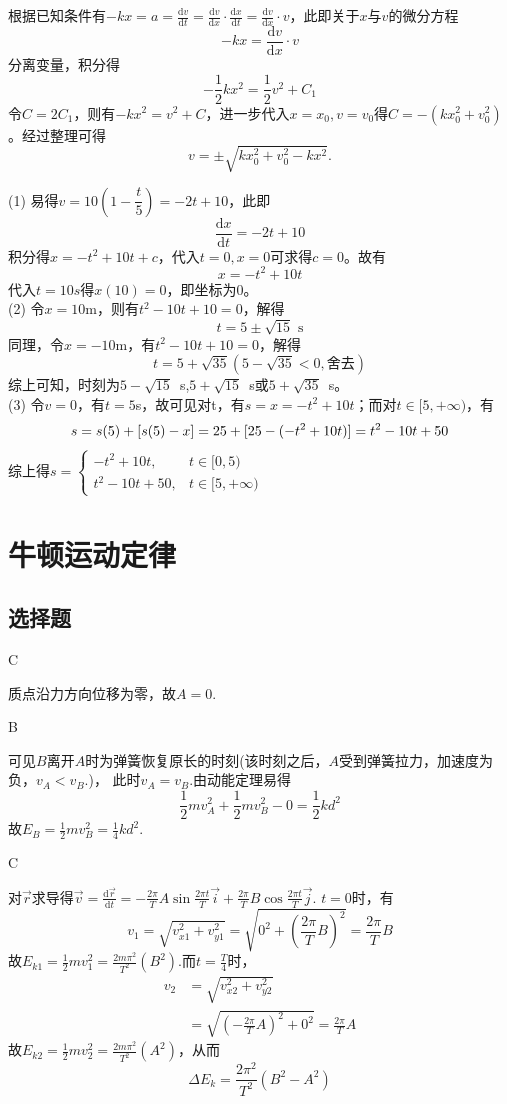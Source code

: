 \documentclass[b5paper,opensource,sourcefont,parskip]{qyxf-book}
\newcommand{\di}[1]{\mathrm{d}#1}
\newcommand{\dy}[2]{\frac{\di{#1}}{\di{#2}}}
\begin{document}

\solve 根据已知条件有$-kx=a=\dy{v}{t}=\dy{v}{x}\cdot \dy{x}{t}=\dy{v}{x}\cdot v$，此即关于$x$与$v$的微分方程
\[-kx=\dy{v}{x}\cdot v\]
分离变量，积分得
\[-\dfrac{1}{2}kx^2=\dfrac{1}{2}v^2+C_1\]
令$C=2C_1$，则有$-kx^2=v^2+C$，进一步代入$x=x_0,v=v_0$得$C=-(kx_0^2+v_0^2)$。经过整理可得
\[v=\pm\sqrt{kx_0^2+v_0^2-kx^2}.\]



\solve (1) 易得$v=10\left(1-\dfrac{t}{5}\right)=-2t+10$，此即
\[
\dy{x}{t}=-2t+10
\]
积分得$x=-t^2+10t+c$，代入$t=0,x=0$可求得$c=0$。故有
\[x=-t^2+10t\]
代入$t=10s$得$x(10)=0$，即坐标为0。\\
(2) 令$x=10$m，则有$t^2-10t+10=0$，解得
\[t=5\pm\sqrt{15}\text{ s}\]
同理，令$x=-10$m，有$t^2-10t+10=0$，解得
\[t=5+\sqrt{35}(5-\sqrt{35}<0,\text{舍去})\]
综上可知，时刻为$5-\sqrt{15}$\ s,$5+\sqrt{15}$\ s或$5+\sqrt{35}$\ s。\\
(3) 令$v=0$，有$t=5$s，故可见对t\in[0,5]，有$s=x=-t^2+10t$；而对$t\in[5,+\infty)$，有
\[s=s(5)+[s(5)-x]=25\\+[25-(-t^2+10t)]=t^2-10t+50\]
综上得$s=
\begin{cases}
-t^2+10t,&t\in[0,5)\\
t^2-10t+50,&t\in[5,+\infty)
\end{cases}$

\chapter{牛顿运动定律}
\section{选择题}

C

\solve 质点沿力方向位移为零，故$A=0$.

B

\solve 可见$B$离开$A$时为弹簧恢复原长的时刻(该时刻之后，$A$受到弹簧拉力，加速度为负，$v_A<v_B$.)，
此时$v_A=v_B$.由动能定理易得
\[\frac{1}{2}mv_A^2+\frac{1}{2}mv_B^2-0=\frac{1}{2}kd^2\]
故$E_B=\frac{1}{2}mv_B^2=\frac{1}{4}kd^2$.


C

\solve 对$\vec{r}$求导得$\vec{v}=\frac{\di{\vec{r}}}{\di{t}}=-\frac{2\pi}{T}A\sin\frac{2\pi t}{T}\vec{i}+\frac{2\pi}{T}B\cos\frac{2\pi t}{T}\vec{j}$.
$t=0$时，有
\[
v_1=\sqrt{v_{x1}^2+v_{y1}^2}=\sqrt{0^2+\left(\frac{2\pi}{T}B\right)^2}=\frac{2\pi}{T}B
\]
故$E_{k1}=\frac{1}{2}mv_1^2=\frac{2m\pi^2}{T^2}\left(B^2\right)$.而$t=\frac{T}{4}$时，
\begin{align*}
v_2&=\sqrt{v_{x2}^2+v_{y2}^2}\\
&=\sqrt{\left(-\frac{2\pi}{T}A\right)^2+0^2}=\frac{2\pi}{T}A
\end{align*}
故$E_{k2}=\frac{1}{2}mv_2^2=\frac{2m\pi^2}{T^2}\left(A^2\right)$，从而
\[\Delta{}E_k=\frac{2\pi^2}{T^2}(B^2-A^2)\]
\end{document}
